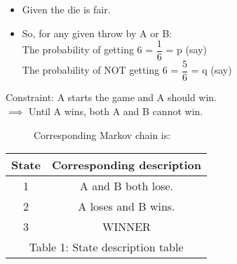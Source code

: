 \begin{itemize}
    \item Given the die is fair.
    \item So, for any given throw by A or B:\\
    The probability of getting 6 = $\dfrac{1}{6}$ = p (say)\\
    The probability of NOT getting 6 = $\dfrac{5}{6}$ = q (say)
\end{itemize}
Constraint: A starts the game and A should win.\\
$\implies$ Until A wins, both A and B cannot win.\\
\begin{figure}[!htb]
Corresponding Markov chain is:\\
\begin{center}
        \label{markov/2/fig:Fig1}
\end{center}
\end{figure}
\begin{table}[!htb]
    \begin{center}
    \begin{tabular}{|c|c|}
        \hline
        State & Corresponding description \\
        \hline
        1 & A and B both lose.\\
        \hline
        2 & A loses and B wins.\\
        \hline
        3 & WINNER\\
        \hline
      \multicolumn{2}{c}{Table 1: State description table}
    \end{tabular}
    \end{center}
\end{table}
